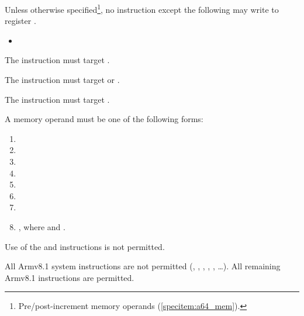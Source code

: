 \specitem
Unless otherwise specified\footnote{Pre/post-increment memory operands (\ref{specitem:a64_mem}).}, no instruction except the following may write to register \xsp.

\begin{itemize}
    \item {}
\end{itemize}


\specitem
The  instruction must target \xaddr.

\specitem
The  instruction must target \xaddr or \xret.

\specitem
The  instruction must target \xret.


\specitem
\label{specitem:a64_mem}
A memory operand must be one of the following forms:

\begin{enumerate}
    \item \code{[\xaddr, \#i]}
    \item \code{[\xaddr, \#i]!}
    \item {}
    \item \code{[\xsp, \#i]}
    \item \code{[\xsp, \#i]!}
    \item {}
    \item {}
    \item \code{[\xbase, \#i]}, where  and .
\end{enumerate}


\specitem
Use of the  and  instructions is not permitted.


\specitem
All Armv8.1 system instructions are not permitted (, , , , , \ldots). All remaining Armv8.1 instructions are permitted.

\let\xbase\undefined
\let\xaddr\undefined
\let\xret\undefined
\let\xsp\undefined
